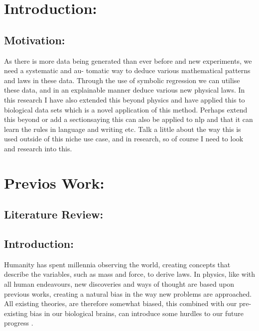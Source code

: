 \documentclass{article}
\begin{document}
\newpage

\tableofcontents 

\newpage
{}



\section{Introduction: }

\subsection{Motivation: }

As there is more data being generated than ever before and new experiments, we need a systematic and au-
tomatic way to deduce various mathematical patterns and laws in these data. Through the use of symbolic
regression we can utilise these data, and in an explainable manner deduce various new physical laws. In this
research I have also extended this beyond physics and have applied this to biological data sets which is a novel
application of this method. Perhaps extend this beyond or add a sectionsaying this can also be applied to nlp
and that it can learn the rules in language and writing etc.
Talk a little about the way this is used outside of this niche use case, and in research, so of course I need to look
and research into this.\\

\section{Previos Work: }

\subsection{Literature Review: }

\subsection{ Introduction: }
  
Humanity has spent millennia observing the world, creating concepts that describe the variables, such as mass and force, to derive laws. In physics, like with
all human endeavours, new discoveries and ways of thought are based upon previous works, creating
a natural bias in the way new problems are approached. All existing theories, are therefore
somewhat biased, this combined with our pre-existing bias in our biological brains, can introduce some
hurdles to our future progress \cite{Wood2022} \cite{Schmidt2009}.\\
\end{document}
